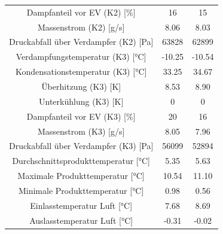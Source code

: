 \begin{table}[h!]
\begin{tabular}{|ccc|}
\multicolumn{1}{|c|}{Dampfanteil vor EV (K2) {[}\%{]}}          & \multicolumn{1}{c|}{16}     & 15          \\
\multicolumn{1}{|c|}{Massenstrom (K2) {[}g/s{]}}                & \multicolumn{1}{c|}{8.06}   & 8.03        \\
\multicolumn{1}{|c|}{Druckabfall über Verdampfer (K2) {[}Pa{]}} & \multicolumn{1}{c|}{63828}  & 62899       \\ \hline
\multicolumn{1}{|c|}{Verdampfungstemperatur (K3) {[}°C{]}}      & \multicolumn{1}{c|}{-10.25} & -10.54      \\
\multicolumn{1}{|c|}{Kondensationstemperatur (K3) {[}°C{]}}    & \multicolumn{1}{c|}{33.25}  & 34.67       \\
\multicolumn{1}{|c|}{Überhitzung (K3) {[}K{]}}                  & \multicolumn{1}{c|}{8.53}   & 8.90        \\
\multicolumn{1}{|c|}{Unterkühlung (K3) {[}K{]}}                 & \multicolumn{1}{c|}{0}      & 0           \\
\multicolumn{1}{|c|}{Dampfanteil vor EV (K3) {[}\%{]}}          & \multicolumn{1}{c|}{20}     & 16          \\
\multicolumn{1}{|c|}{Massenstrom (K3) {[}g/s{]}}                & \multicolumn{1}{c|}{8.05}   & 7.96        \\
\multicolumn{1}{|c|}{Druckabfall über Verdampfer (K3) {[}Pa{]}} & \multicolumn{1}{c|}{56099}  & 52894       \\ \hline
\multicolumn{1}{|c|}{Durchschnittsprodukttemperatur {[}°C{]}}   & \multicolumn{1}{c|}{5.35}   & 5.63        \\
\multicolumn{1}{|c|}{Maximale Produkttemperatur {[}°C{]}}       & \multicolumn{1}{c|}{10.54}  & 11.10       \\
\multicolumn{1}{|c|}{Minimale Produkttemperatur {[}°C{]}}       & \multicolumn{1}{c|}{0.98}   & 0.56        \\
\multicolumn{1}{|c|}{Einlasstemperatur Luft {[}°C{]}}           & \multicolumn{1}{c|}{7.68}   & 8.69        \\
\multicolumn{1}{|c|}{Auslasstemperatur Luft {[}°C{]}}           & \multicolumn{1}{c|}{-0.31}  & -0.02       \\ \hline
\end{tabular}
\end{table}





\clearpage











